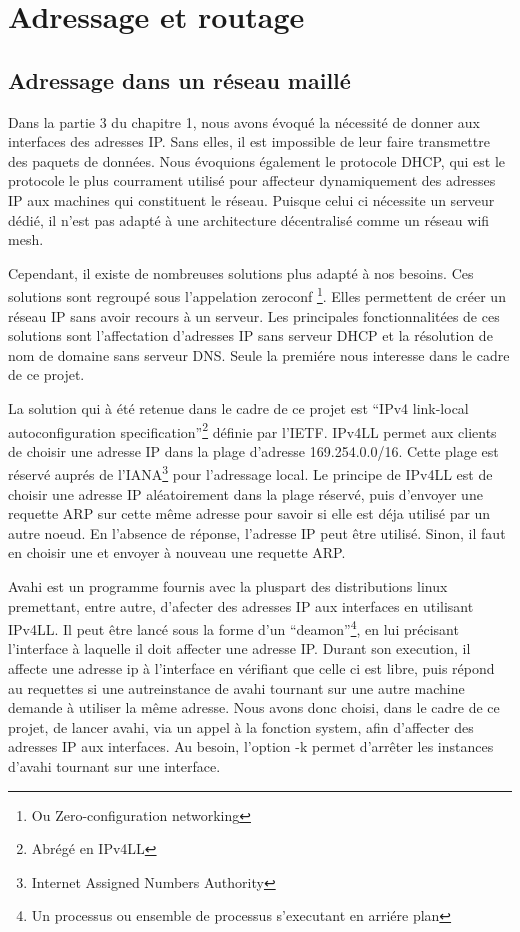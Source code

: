 \chapter{Adressage et routage}
\section{Adressage dans un réseau maillé}

Dans la partie 3 du chapitre 1, nous avons évoqué la nécessité de donner aux interfaces des adresses IP. Sans elles, il est
impossible de leur faire transmettre des paquets de données. Nous évoquions également le protocole DHCP, qui est le protocole le plus
courrament utilisé pour affecteur dynamiquement des adresses IP aux machines qui constituent le réseau. Puisque celui ci nécessite un
serveur dédié, il n'est pas adapté à une architecture décentralisé comme un réseau wifi mesh.

Cependant, il existe de nombreuses solutions plus adapté à nos besoins. Ces solutions sont regroupé sous l'appelation zeroconf
\footnote{Ou Zero-configuration networking}. Elles permettent de créer un réseau IP sans avoir recours à un serveur.
Les principales fonctionnalitées de ces solutions sont l'affectation d'adresses IP sans serveur DHCP et la résolution de nom de 
domaine sans serveur DNS. Seule la premiére nous interesse dans le cadre de ce projet.

La solution qui à été retenue dans le cadre de ce projet est ``IPv4 link-local autoconfiguration specification''\footnote{Abrégé en
IPv4LL} définie par l'IETF\cite{ipv4ll}. IPv4LL permet aux clients de choisir une adresse IP dans la plage d'adresse 169.254.0.0/16.
Cette plage est réservé auprés de l'IANA\footnote{Internet Assigned Numbers Authority} pour l'adressage local. Le principe de IPv4LL
est de choisir une adresse IP aléatoirement dans la plage réservé, puis d'envoyer une requette ARP sur cette même adresse pour savoir
si elle est déja utilisé par un autre noeud. En l'absence de réponse, l'adresse IP peut être utilisé. Sinon, il faut en choisir une
et envoyer à nouveau une requette ARP.

Avahi est un programme fournis avec la pluspart des distributions linux premettant, entre autre, d'afecter des adresses IP aux
interfaces en utilisant IPv4LL. Il peut être lancé sous la forme d'un ``deamon''\footnote{Un processus ou ensemble de processus
s'executant en arriére plan}, en lui précisant l'interface à laquelle il doit affecter une adresse IP. Durant son execution, il
affecte une adresse ip à l'interface en vérifiant que celle ci est libre, puis répond au requettes si une autreinstance de avahi
tournant sur une autre machine demande à utiliser la même adresse. Nous avons donc choisi, dans le cadre de ce projet, de lancer
avahi, via un appel à la fonction system, afin d'affecter des adresses IP aux interfaces. Au besoin, l'option -k permet d'arrêter
les instances d'avahi tournant sur une interface.

